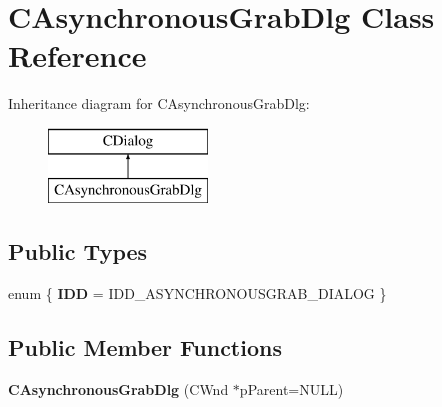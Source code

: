 \hypertarget{class_c_asynchronous_grab_dlg}{}\section{C\+Asynchronous\+Grab\+Dlg Class Reference}
\label{class_c_asynchronous_grab_dlg}
Inheritance diagram for C\+Asynchronous\+Grab\+Dlg\+:\begin{figure}[H]
\begin{center}
\leavevmode
\includegraphics[height=2.000000cm]{class_c_asynchronous_grab_dlg}
\end{center}
\end{figure}
\subsection*{Public Types}
\begin{DoxyCompactItemize}
\item 
\mbox{\label{class_c_asynchronous_grab_dlg_aa71938de5350ae71062a26f6f3506dca}} 
enum \{ {\bfseries I\+DD} = I\+D\+D\+\_\+\+A\+S\+Y\+N\+C\+H\+R\+O\+N\+O\+U\+S\+G\+R\+A\+B\+\_\+\+D\+I\+A\+L\+OG
 \}
\end{DoxyCompactItemize}
\subsection*{Public Member Functions}
\begin{DoxyCompactItemize}
\item 
\mbox{\label{class_c_asynchronous_grab_dlg_a2a8491d7e5e8dc44c359be44e8237c87}} 
{\bfseries C\+Asynchronous\+Grab\+Dlg} (C\+Wnd $\ast$p\+Parent=N\+U\+LL)
\end{DoxyCompactItemize}
